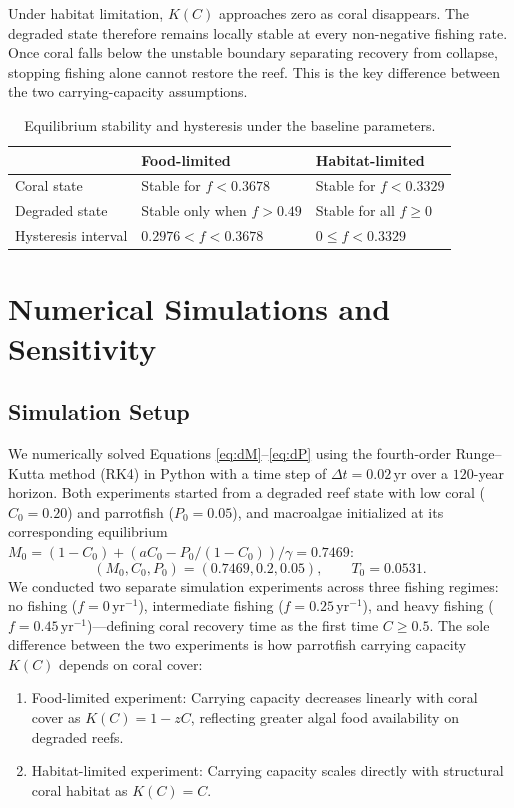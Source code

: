 \documentclass[10pt,a4paper]{article}
\begin{document}
Under habitat limitation, $K(C)$ approaches zero as coral disappears. The degraded state therefore remains locally stable at every non-negative fishing rate. Once coral falls below the unstable boundary separating recovery from collapse, stopping fishing alone cannot restore the reef. This is the key difference between the two carrying-capacity assumptions.

\begin{table}[htbp]
\centering
\small
\caption{Equilibrium stability and hysteresis under the baseline parameters.}
\label{tab:equilibria}
\begin{tabularx}{\textwidth}{@{}l X X@{}}
\toprule
 & \textbf{Food-limited} & \textbf{Habitat-limited}\\
\midrule
Coral state & Stable for $f<0.3678$ & Stable for $f<0.3329$\\
Degraded state & Stable only when $f>0.49$ & Stable for all $f\geq0$\\
Hysteresis interval & $0.2976<f<0.3678$ & $0\leq f<0.3329$\\
\bottomrule
\end{tabularx}
\end{table}

\section{Numerical Simulations and Sensitivity}

\subsection{Simulation Setup}

We numerically solved Equations \eqref{eq:dM}--\eqref{eq:dP} using the fourth-order Runge--Kutta method (RK4) in Python with a time step of $\Delta t=0.02\,\mathrm{yr}$ over a $120$-year horizon. Both experiments started from a degraded reef state with low coral ($C_0=0.20$) and parrotfish ($P_0=0.05$), and macroalgae initialized at its corresponding equilibrium $M_0=(1-C_0)+(aC_0-P_0/(1-C_0))/\gamma=0.7469$:
\begin{equation}
    (M_0,C_0,P_0)=(0.7469,0.2,0.05),\qquad T_0=0.0531.
    \label{eq:IC}
\end{equation}
We conducted two separate simulation experiments across three fishing regimes: no fishing ($f=0\,\mathrm{yr}^{-1}$), intermediate fishing ($f=0.25\,\mathrm{yr}^{-1}$), and heavy fishing ($f=0.45\,\mathrm{yr}^{-1}$)—defining coral recovery time as the first time $C\ge 0.5$. The sole difference between the two experiments is how parrotfish carrying capacity $K(C)$ depends on coral cover:
\begin{enumerate}
    \item Food-limited experiment: Carrying capacity decreases linearly with coral cover as $K(C)=1-zC$, reflecting greater algal food availability on degraded reefs.
    \item Habitat-limited experiment: Carrying capacity scales directly with structural coral habitat as $K(C)=C$.
\end{enumerate}
\end{document}
